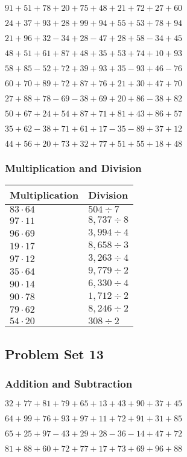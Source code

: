 \(91+51+78+20+75+48+21+72+27+ 60\)

\(24+37+93+28+99+94+55+53+78+94\)

\(21+96+32-34+28-47+28+58-34+45\)

\(48+51+61+87+48+35+53+74+10+93\)

\(58+85-52+72+39+93+35-93+46-76\)

\(60+70+89+72+87+76+21+30+47+70\)

\(27+88+78-69-38+69+20+86-38+82\)

\(50+67+24+54+87+71+81+43+86+57\)

\(35+62-38+71+61+17-35-89+37+12\)

\(44+56+20+73+32+77+51+55+18+48\)

\hypertarget{multiplication-and-division-52}{%
\subsubsection{Multiplication and
Division}\label{multiplication-and-division-52}}

\begin{longtable}[]{@{}ll@{}}
\toprule
Multiplication & Division\tabularnewline
\midrule
\endhead
\(83\cdot64\) & \(504÷7\)\tabularnewline
\(97\cdot11\) & \(8,737÷8\)\tabularnewline
\(96\cdot69\) & \(3,994÷4\)\tabularnewline
\(19\cdot17\) & \(8,658÷3\)\tabularnewline
\(97\cdot12\) & \(3,263÷4\)\tabularnewline
\(35\cdot64\) & \(9,779÷2\)\tabularnewline
\(90\cdot14\) & \(6,330÷4\)\tabularnewline
\(90\cdot78\) & \(1,712÷2\)\tabularnewline
\(79\cdot62\) & \(8,246÷2\)\tabularnewline
\(54\cdot20\) & \(308÷2\)\tabularnewline
\bottomrule
\end{longtable}

\hypertarget{problem-set-13-1}{%
\subsection{Problem Set 13}\label{problem-set-13-1}}

\hypertarget{addition-and-subtraction-53}{%
\subsubsection{Addition and
Subtraction}\label{addition-and-subtraction-53}}

\(32+77+81+79+65+13+43+90+37+ 45\)

\(64+99+76+93+97+11+72+91+31+85\)

\(65+25+97-43+29+28-36-14+47+72\)

\(81+88+60+72+77+17+73+69+96+88\)

